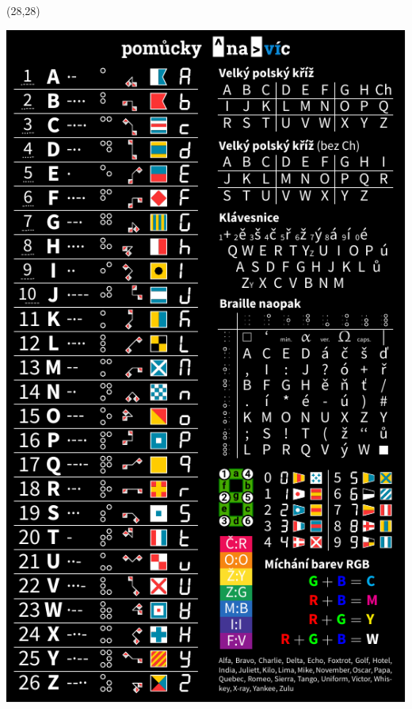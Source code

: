 \documentclass{extarticle}
\begin{document}
\pagestyle{empty}


\begin{textblock}{92}(28,28)
\vfill
{\centerline{\includegraphics[scale=1,]{tools-wide-front.pdf}}} 
\vfill
\end{textblock}
\end{document}
